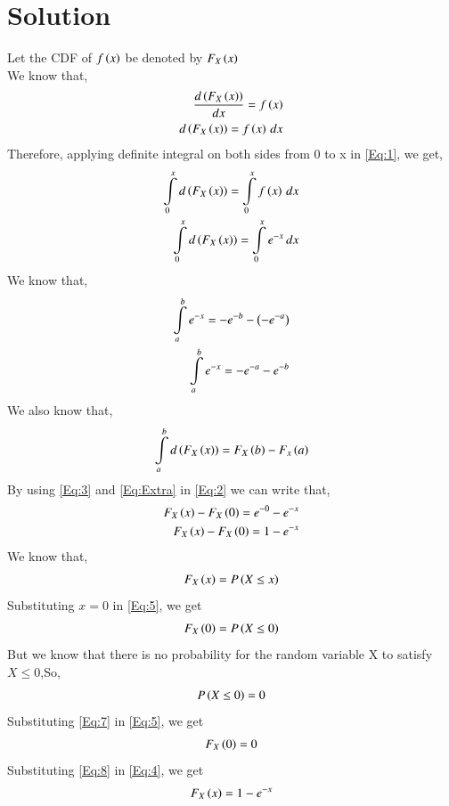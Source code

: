 \documentclass[journal,12pt,twocolumn]{IEEEtran}
\begin{document}
\section{Solution}
Let the CDF of $f\left(x\right)$ be denoted by $F_X\left(x\right)$ \\
We know that,
\begin{align}
\frac{d\left(F_X\left(x\right)\right)}{dx} = f\left(x\right) \notag \\
d\left(F_X\left(x\right)\right) = f\left(x\right) \,dx \label{Eq:1}
\end{align}
Therefore, applying definite integral on both sides from 0 to x in \eqref{Eq:1}, we get,
\begin{align}
\int\limits_{0}^{x} d\left(F_X\left(x\right)\right) = \int\limits_{0}^{x} f\left(x\right) \,dx \notag \\
\int\limits_{0}^{x} d\left(F_X\left(x\right)\right) = \int\limits_{0}^{x} e^{-x} \,dx \label{Eq:2}
\end{align}
We know that,
\begin{align}
\int\limits_{a}^{b} e^{-x} = -e^{-b}-\left(-e^{-a}\right) \notag \\
\int\limits_{a}^{b} e^{-x} = -e^{-a}-e^{-b}\label{Eq:3}
\end{align}
We also know that,
\begin{align}
\int\limits_{a}^{b} d\left(F_X\left(x\right)\right) = F_X\left(b\right) - F_x\left(a\right) \label{Eq:Extra}
\end{align}
By using \eqref{Eq:3} and \eqref{Eq:Extra} in \eqref{Eq:2} we can write that,
\begin{align}
F_X\left(x\right) - F_X\left(0\right) = e^{-0} - e^{-x} \notag \\
F_X\left(x\right) - F_X\left(0\right) = 1 - e^{-x} \label{Eq:4}
\end{align}
We know that,
\begin{align}
F_X\left(x\right) = P\left(X\leq x\right) \label{Eq:5}
\end{align}
Substituting $x = 0$ in \eqref{Eq:5}, we get
\begin{align}
F_X\left(0\right) = P\left(X \leq 0\right) \label{Eq:6}
\end{align}
But we know that there is no probability for the random variable X to satisfy $X \leq 0$,So,
\begin{align}
P\left(X \leq 0\right) = 0 \label{Eq:7}
\end{align}
Substituting \eqref{Eq:7} in \eqref{Eq:5}, we get
\begin{align}
F_X\left(0\right) = 0 \label{Eq:8}
\end{align}
Substituting \eqref{Eq:8} in \eqref{Eq:4}, we get
\begin{align}
F_X\left(x\right) = 1 - e^{-x} \label{Eq:11}
\end{align}
\end{document}

